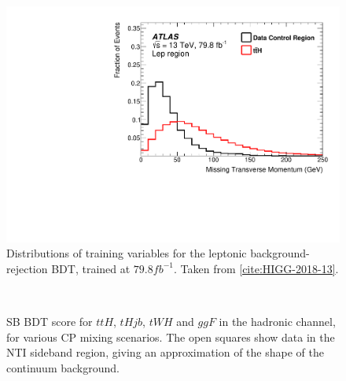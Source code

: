 \begin{figure}
	\includegraphics[width=0.31\linewidth]{figures/tthcp_chapter/figaux_11g.pdf}
	\caption{Distributions of training variables for the leptonic background-rejection BDT, trained at $79.8 fb^{-1}$. Taken from \ref{cite:HIGG-2018-13}.}
	\label{fig:SBBDTvarslep}
\end{figure}

\iffalse
\begin{figure}[htbp]
  \centering
         \\
  \caption{SB BDT score for $ttH$, $tHjb$, $tWH$ and $ggF$ in the hadronic channel, for various CP mixing scenarios. The open squares show data in the NTI sideband region, giving an approximation of the shape of the continuum background.  }
  \label{fig:moriondhad}
\end{figure}

